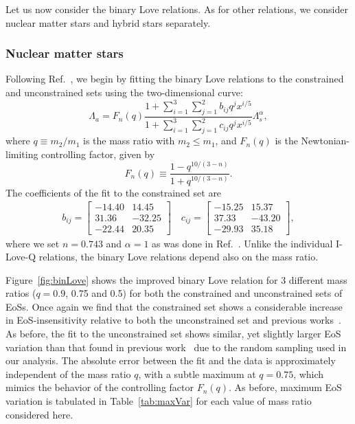 \documentclass[prd,twocolumn,nofootinbib,superscriptaddress,amsmath,amssymb]{revtex4-1}
\begin{document}
Let us now consider the binary Love relations. As for other relations, we consider nuclear matter stars and hybrid stars separately.

\subsubsection{Nuclear matter stars}

Following Ref.~\cite{Yagi:binLove}, we begin by fitting the binary Love relations to the constrained and unconstrained sets using the two-dimensional curve:
\begin{equation}\label{eq:binLovefit}
\Lambda_a=F_n(q) \frac{1+ \sum_{i=1}^3 \sum_{j=1}^2 b_{ij}q^j x^{i/5}}{1 + \sum_{i=1}^3 \sum_{j=1}^2 c_{ij}q^j x^{i/5}} \Lambda_s^{\alpha},
\end{equation}
where $q\equiv m_{2}/m_{1}$ is the mass ratio with $m_2 \leq m_1$, and $F_n(q)$ is the Newtonian-limiting controlling factor, given by
\begin{equation}\label{eq:control}
F_n(q) \equiv \frac{1-q^{10/(3-n)}}{1+q^{10/(3-n)}}.
\end{equation}
The coefficients of the fit to the constrained set are 
\begin{align}
b_{ij} = \begin{bmatrix}
    -14.40 & 14.45   \\
    31.36 & -32.25   \\
    -22.44 & 20.35   
\end{bmatrix}
\quad
c_{ij} = \begin{bmatrix}
    -15.25 & 15.37   \\
    37.33 & -43.20   \\
    -29.93 & 35.18   
\end{bmatrix},
\end{align}
where we set $n = 0.743$ and $\alpha = 1$ as was done in Ref.~\cite{Yagi:binLove}.
Unlike the individual I-Love-Q relations, the binary Love relations depend also on the mass ratio. 

Figure~\ref{fig:binLove} shows the improved binary Love relation for 3 different mass ratios ($q=0.9$, 0.75 and 0.5) for both the constrained and unconstrained sets of EoSs. Once again we find that the constrained set shows a considerable increase in EoS-insensitivity relative to both the unconstrained set and previous works~\cite{Yagi:binLove}. As before, the fit to the unconstrained set shows similar, yet slightly larger EoS variation than that found in previous work~\cite{Yagi:binLove} due to the random sampling used in our analysis. The absolute error between the fit and the data is approximately independent of the mass ratio $q$, with a subtle maximum at $q=0.75$, which mimics the behavior of the controlling factor $F_n(q)$. As before, maximum EoS variation is tabulated in Table~\ref{tab:maxVar} for each value of mass ratio considered here.
\end{document}
